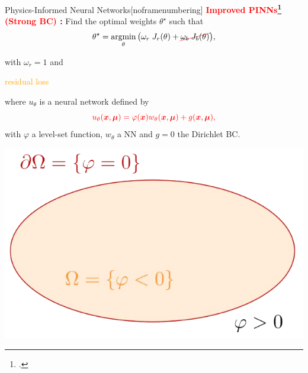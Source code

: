 \begin{subappendixframe}{Physics-Informed Neural Networks}[noframenumbering]
	\textbf{\textcolor{red}{Improved PINNs\footcite{LagLikFot1998,FraMicNav2024} (Strong BC)} :} Find the optimal weights $\theta^\star$ such that
	\begin{equation*}
		\theta^\star = \argmin_{\theta}	\big( \omega_r \; J_r(\theta) + \Ccancel[red]{\omega_b \; J_b(\theta)} \big),%
	\end{equation*}
	
	\vspace{-5pt}
	with $\omega_r=1$ and
	\vspace{5pt}

	\begin{minipage}{0.2\linewidth}
		\flushright
		\textcolor{orange}{residual loss}
	\end{minipage}
	\begin{minipage}{0.68\linewidth}
		\centering
	\end{minipage}

	\vspace{15pt}
	\begin{minipage}{0.75\linewidth}
		where $u_\theta$ is a neural network defined by
		\begin{equation*}
			\textcolor{red}{u_{\theta}(\bm{x},\bm{\mu}) = \varphi(\bm{x}) w_{\theta}(\bm{x},\bm{\mu}) + g(\bm{x},\bm{\mu}),}
		\end{equation*}
		with $\varphi$ a level-set function, $w_\theta$ a NN and $g=0$ the Dirichlet BC. 
	\end{minipage}
	\begin{minipage}{0.23\linewidth}
		\vspace{-15pt}
		\hspace{-23pt}\includegraphics[width=1.3\linewidth]{images/appendix/std_method/levelset.png}
	\end{minipage}


\end{subappendixframe}

